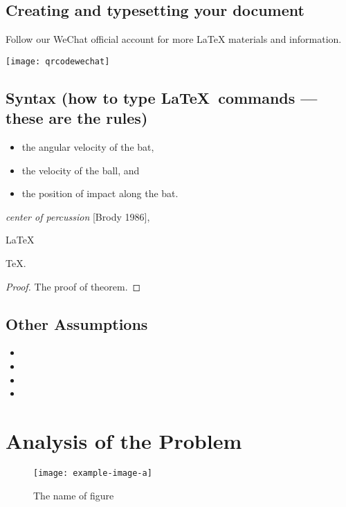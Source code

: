 \documentclass{mcmthesis}
\begin{document}
\subsection{Creating and typesetting your document}

Follow our WeChat official account for more LaTeX materials and information.

\centerline{\texttt{[image: qrcodewechat]}}

\subsection{Syntax (how to type \LaTeX\ commands --- these
  are the rules)}

\lipsum[3]
\begin{itemize}
\item the angular velocity of the bat,
\item the velocity of the ball, and
\item the position of impact along the bat.
\end{itemize}
\lipsum[4]
\emph{center of percussion} [Brody 1986], \lipsum[5]

\begin{Theorem} \label{thm:latex}
\LaTeX
\end{Theorem}
\begin{Lemma} \label{thm:tex}
\TeX .
\end{Lemma}
\begin{proof}
The proof of theorem.
\end{proof}

\subsection{Other Assumptions}
\lipsum[6]
\begin{itemize}
\item
\item
\item
\item
\end{itemize}

\lipsum[7]

\section{Analysis of the Problem}
\begin{figure}[h]
\small
\centering
\texttt{[image: example-image-a]}
\caption{The name of figure} \label{fig:aa}
\end{figure}
\end{document}
